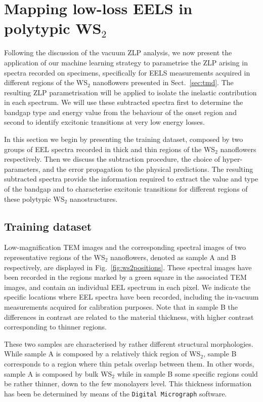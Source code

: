 \section{Mapping low-loss EELS in polytypic WS$_2$}
\label{sec:results_sample}

Following the discussion of the vacuum ZLP analysis, we now
present the application of our machine learning strategy to parametrise the ZLP
arising in spectra recorded on specimens, specifically for
EELS measurements acquired in different regions
of the WS$_2$ nanoflowers presented in Sect.~\ref{sec:tmd}.
%
The resulting ZLP parametrisation will be applied to isolate the inelastic
contribution in each spectrum.
%
We will use these subtracted spectra first to determine the bandgap type and energy 
value from the behaviour of the onset region and second to identify excitonic
transitions at very low energy losses.

In this section we begin by presenting the training dataset, composed by two groups of EEL spectra recorded
in thick and thin regions of the WS$_2$  nanoflowers respectively.
%
Then we discuss the subtraction procedure, the choice of hyper-parameters, and the error propagation
to the physical predictions.
%
The resulting subtracted spectra provide the information
required to extract the value and type of the bandgap
and to characterise excitonic transitions for different regions of these polytypic WS$_2$ nanostructures.

\subsection{Training dataset}

Low-magnification TEM images  and the corresponding
spectral images of two representative regions of
the WS$_2$ nanoflowers, denoted as sample A and B  respectively, are displayed in Fig.~\ref{fig:ws2positions}.
%
These spectral images have been recorded in the regions marked by a green square
in the associated TEM images, and contain an individual EEL spectrum in each pixel.
%
We indicate the specific locations where
EEL spectra have been recorded, including the in-vacuum measurements acquired
for calibration purposes.
%
Note that in sample B  the differences in contrast are related to the material
thickness, with higher contrast corresponding to thinner regions.

These two samples are characterised by rather different structural morphologies.
%
While sample A is composed
by a relatively thick region of WS$_2$, sample B corresponds to a region where thin petals
overlap between them.
%
In other words, sample A is composed by bulk WS$_2$ while in sample B some specific regions
could be rather thinner, down to the few monolayers level.
%
This thickness information has been be determined
by means of the {\tt Digital~Micrograph}  software.

